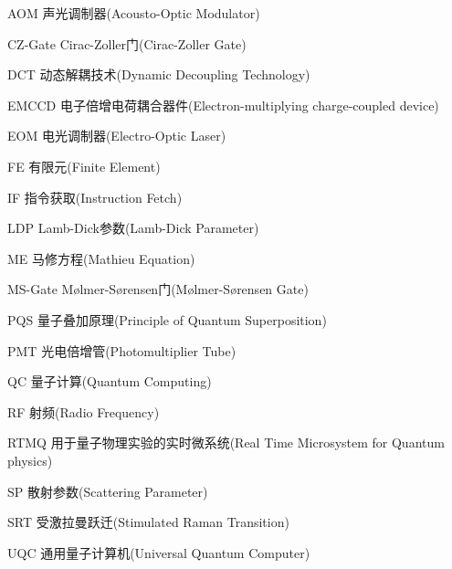 \begin{denotation}[3cm]

  \item[AOM] 声光调制器(Acousto-Optic Modulator)
  \item[CZ-Gate] Cirac-Zoller门(Cirac-Zoller Gate)
  \item[DCT] 动态解耦技术(Dynamic Decoupling Technology)  
  \item[EMCCD] 电子倍增电荷耦合器件(Electron-multiplying charge-coupled device)
  \item[EOM] 电光调制器(Electro-Optic Laser)
  \item[FE] 有限元(Finite Element)
  \item[IF] 指令获取(Instruction Fetch)
  \item[LDP] Lamb-Dick参数(Lamb-Dick Parameter)
  \item[ME] 马修方程(Mathieu Equation)
  \item[MS-Gate] Mølmer-Sørensen门(Mølmer-Sørensen Gate)
  \item[PQS] 量子叠加原理(Principle of Quantum Superposition)
  \item[PMT] 光电倍增管(Photomultiplier Tube)
  \item[QC] 量子计算(Quantum Computing)
  \item[RF] 射频(Radio Frequency)
  \item[RTMQ] 用于量子物理实验的实时微系统(Real Time Microsystem for Quantum physics)
  \item[SP] 散射参数(Scattering Parameter)
  \item[SRT] 受激拉曼跃迁(Stimulated Raman Transition)
  \item[UQC] 通用量子计算机(Universal Quantum Computer)

\end{denotation}




